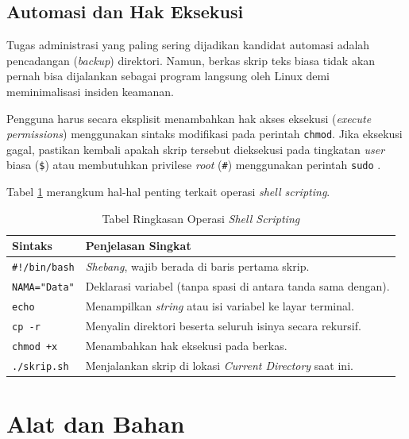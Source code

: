 \subsection{Automasi dan Hak Eksekusi}
Tugas administrasi yang paling sering dijadikan kandidat automasi adalah pencadangan (\textit{backup}) direktori. Namun, berkas skrip teks biasa tidak akan pernah bisa dijalankan sebagai program langsung oleh Linux demi meminimalisasi insiden keamanan. 

Pengguna harus secara eksplisit menambahkan hak akses eksekusi (\textit{execute permissions}) menggunakan sintaks modifikasi pada perintah \texttt{chmod}. Jika eksekusi gagal, pastikan kembali apakah skrip tersebut dieksekusi pada tingkatan \textit{user} biasa (\texttt{\$}) atau membutuhkan privilese \textit{root} (\texttt{\#}) menggunakan perintah \texttt{sudo} \cite{shotts2019linux}.

Tabel \ref{tab:m04-dasar-teori} merangkum hal-hal penting terkait operasi \textit{shell scripting}.

\begin{table}[H]
    \caption{Tabel Ringkasan Operasi \textit{Shell Scripting}}
    \label{tab:m04-dasar-teori}
    \small
    \begin{tabularx}{\textwidth}{|l|X|}
        \hline
        \textbf{Sintaks} & \textbf{Penjelasan Singkat} \\ \hline
        \texttt{\#!/bin/bash} & \textit{Shebang}, wajib berada di baris pertama skrip. \\ \hline
        \texttt{NAMA="Data"} & Deklarasi variabel (tanpa spasi di antara tanda sama dengan). \\ \hline
        \texttt{echo} & Menampilkan \textit{string} atau isi variabel ke layar terminal. \\ \hline
        \texttt{cp -r} & Menyalin direktori beserta seluruh isinya secara rekursif. \\ \hline
        \texttt{chmod +x} & Menambahkan hak eksekusi pada berkas. \\ \hline
        \texttt{./skrip.sh} & Menjalankan skrip di lokasi \textit{Current Directory} saat ini. \\ \hline
    \end{tabularx}
\end{table}

\newpage
\section{Alat dan Bahan}
\label{sec:m04-alat-bahan}

